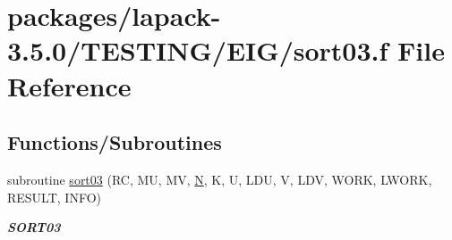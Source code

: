 \hypertarget{sort03_8f}{}\section{packages/lapack-\/3.5.0/\+T\+E\+S\+T\+I\+N\+G/\+E\+I\+G/sort03.f File Reference}
\label{sort03_8f}
\subsection*{Functions/\+Subroutines}
\begin{DoxyCompactItemize}
\item 
subroutine \hyperlink{group__single__eig_gacdb40a265d764f2ce962040de230c2f1}{sort03} (R\+C, M\+U, M\+V, \hyperlink{polmisc_8c_a0240ac851181b84ac374872dc5434ee4}{N}, K, U, L\+D\+U, V, L\+D\+V, W\+O\+R\+K, L\+W\+O\+R\+K, R\+E\+S\+U\+L\+T, I\+N\+F\+O)
\begin{DoxyCompactList}\small\item\em {\bfseries S\+O\+R\+T03} \end{DoxyCompactList}\end{DoxyCompactItemize}
